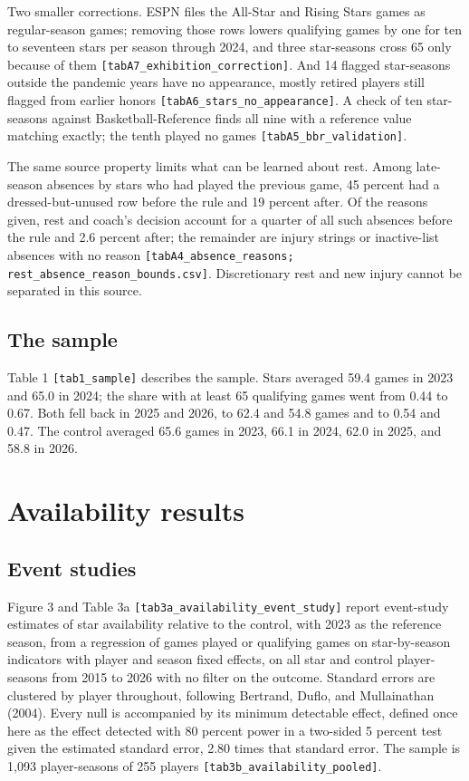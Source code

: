 \documentclass[11pt]{article}
\begin{document}
Two smaller corrections. ESPN files the All-Star and Rising Stars games as regular-season games; removing those rows lowers qualifying games by one for ten to seventeen stars per season through 2024, and three star-seasons cross 65 only because of them {\small\texttt{[tabA7\_exhibition\_correction]}}. And 14 flagged star-seasons outside the pandemic years have no appearance, mostly retired players still flagged from earlier honors {\small\texttt{[tabA6\_stars\_no\_appearance]}}. A check of ten star-seasons against Basketball-Reference finds all nine with a reference value matching exactly; the tenth played no games {\small\texttt{[tabA5\_bbr\_validation]}}.

The same source property limits what can be learned about rest. Among late-season absences by stars who had played the previous game, 45 percent had a dressed-but-unused row before the rule and 19 percent after. Of the reasons given, rest and coach's decision account for a quarter of all such absences before the rule and 2.6 percent after; the remainder are injury strings or inactive-list absences with no reason {\small\texttt{[tabA4\_absence\_reasons; rest\_absence\_reason\_bounds.csv]}}. Discretionary rest and new injury cannot be separated in this source.


\subsection*{The sample}


Table 1 {\small\texttt{[tab1\_sample]}} describes the sample. Stars averaged 59.4 games in 2023 and 65.0 in 2024; the share with at least 65 qualifying games went from 0.44 to 0.67. Both fell back in 2025 and 2026, to 62.4 and 54.8 games and to 0.54 and 0.47. The control averaged 65.6 games in 2023, 66.1 in 2024, 62.0 in 2025, and 58.8 in 2026.


\section{Availability results}



\subsection*{Event studies}


Figure 3 and Table 3a {\small\texttt{[tab3a\_availability\_event\_study]}} report event-study estimates of star availability relative to the control, with 2023 as the reference season, from a regression of games played or qualifying games on star-by-season indicators with player and season fixed effects, on all star and control player-seasons from 2015 to 2026 with no filter on the outcome. Standard errors are clustered by player throughout, following Bertrand, Duflo, and Mullainathan (2004). Every null is accompanied by its minimum detectable effect, defined once here as the effect detected with 80 percent power in a two-sided 5 percent test given the estimated standard error, 2.80 times that standard error. The sample is 1,093 player-seasons of 255 players {\small\texttt{[tab3b\_availability\_pooled]}}.
\end{document}
